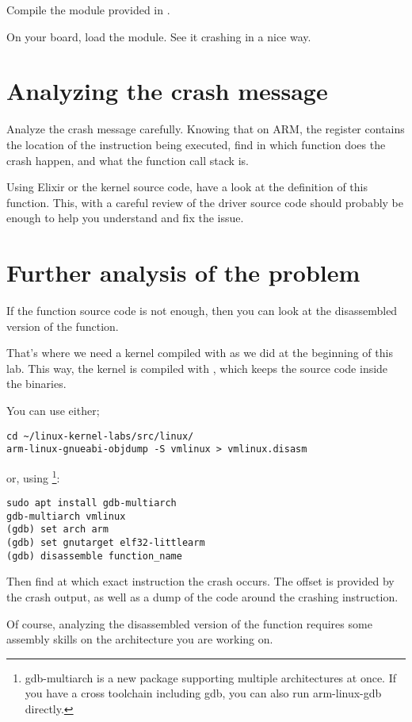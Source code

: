 Compile the  module provided in .

On your board, load the  module. See it crashing
in a nice way.

\section{Analyzing the crash message}

Analyze the crash message carefully. Knowing that on ARM, the 
register contains the location of the instruction being executed, find
in which function does the crash happen, and what the function call
stack is.

Using Elixir or the kernel source code, have a look at the definition of this
function. This, with a careful review of the driver source code should
probably be enough to help you understand and fix the issue.

\section{Further analysis of the problem}

If the function source code is not enough, then you can look at the
disassembled version of the function.

That's where we need a kernel compiled with 
as we did at the beginning of this lab. This way, the kernel is
compiled with , which keeps the source
code inside the binaries.

You can use either;

\begin{verbatim}
cd ~/linux-kernel-labs/src/linux/
arm-linux-gnueabi-objdump -S vmlinux > vmlinux.disasm
\end{verbatim}

or, using \footnote{gdb-multiarch is a new package
supporting multiple architectures at once. If you have a cross
toolchain including gdb, you can also run arm-linux-gdb directly.}:

\begin{verbatim}
sudo apt install gdb-multiarch
gdb-multiarch vmlinux
(gdb) set arch arm
(gdb) set gnutarget elf32-littlearm
(gdb) disassemble function_name
\end{verbatim}

Then find at which exact instruction the crash occurs. The offset is
provided by the crash output, as well as a dump of the code around the
crashing instruction.

Of course, analyzing the disassembled version of the function requires
some assembly skills on the architecture you are working on.
